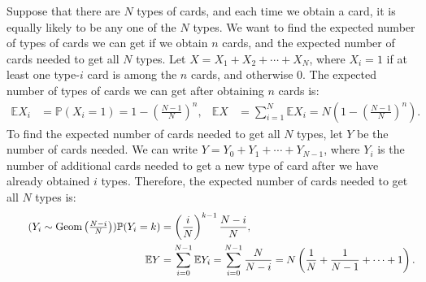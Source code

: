 \documentclass{huhtakm-template-book-v2}
\newcommand{\prob}{\mathbb{P}}
\newcommand{\expect}{\mathbb{E}}
\DeclareMathOperator{\Geom}{Geom}
\begin{document}
    \begin{eg}
        Suppose that there are $N$ types of cards, and each time we obtain a card, it is equally likely to be any one of the $N$ types. We want to find the expected number of types of cards we can get if we obtain $n$ cards, and the expected number of cards needed to get all $N$ types. Let $X = X_{1} + X_{2} + \cdots + X_{N}$, where $X_{i} = 1$ if at least one type-$i$ card is among the $n$ cards, and otherwise $0$. The expected number of types of cards we can get after obtaining $n$ cards is:
        \begin{align*}
            \expect{X_{i}} &= \prob(X_{i} = 1) = 1 - \left(\frac{N-1}{N}\right)^{n}, & \expect{X} &= \sum_{i = 1}^{N}\expect{X_{i}} = N\left(1 - \left(\frac{N-1}{N}\right)^{n}\right).
        \end{align*}
        To find the expected number of cards needed to get all $N$ types, let $Y$ be the number of cards needed. We can write $Y = Y_{0} + Y_{1} + \cdots + Y_{N-1}$, where $Y_{i}$ is the number of additional cards needed to get a new type of card after we have already obtained $i$ types. Therefore, the expected number of cards needed to get all $N$ types is:
        \begin{align*}
            \tag{$Y_{i} \sim \Geom\left(\frac{N-i}{N}\right)$}
            \prob(Y_{i} = k) &= \left(\frac{i}{N}\right)^{k-1}\frac{N-i}{N},\\
            \expect{Y} &= \sum_{i = 0}^{N-1}\expect{Y_{i}} = \sum_{i = 0}^{N-1}\frac{N}{N-i} = N\left(\frac{1}{N} + \frac{1}{N-1} + \cdots + 1\right).
        \end{align*}
    \end{eg}
    \newpage
\end{document}
